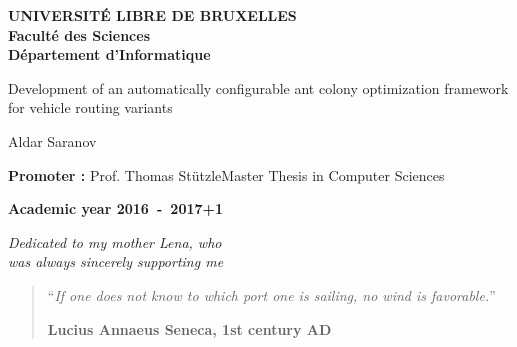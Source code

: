 \documentclass[11pt,a4paper,oneside]{book}
\begin{document}
\frontmatter
\begin{titlepage}
\begin{center}
\textbf{UNIVERSIT\'E LIBRE DE BRUXELLES}\\
\textbf{Facult\'e des Sciences}\\
\textbf{D\'epartement d'Informatique}
\vfill{}\vfill{}

{\Huge Development of an automatically configurable ant colony optimization framework for vehicle routing variants}

{\Huge \par}
\begin{center}{\LARGE Aldar Saranov}\end{center}{\Huge \par}
\vfill{}\vfill{}
\begin{flushright}{\large \textbf{Promoter :} Prof. Thomas St{\"u}tzle}\hfill{}{\large Master Thesis in Computer Sciences}\\
{\large }\hfill{}{}\end{flushright}{\large\par}
\vfill{}\vfill{}\enlargethispage{3cm}
\textbf{Academic year 2016~-~2017+1}
\end{center}
\end{titlepage}
\newpage
\thispagestyle{empty} 
\null

\newenvironment{vcenterpage}
{\newpage\thispagestyle{empty} 
\vspace*{\fill}}
{\vspace*{\fill}\par\pagebreak}

\begin{vcenterpage}
\begin{flushright}
    \large\em\null\vskip1in 
    Dedicated to my mother Lena, who\\
   was always sincerely supporting me\vfill
  \end{flushright}
\end{vcenterpage}
\thispagestyle{empty}
\vspace*{5cm}

\begin{quotation}
\noindent ``\emph{If one does not know to which port one is sailing, no wind is favorable.}''
\begin{flushright}\textbf{Lucius Annaeus Seneca, 1st century AD}\end{flushright}
\end{quotation}

\medskip
\end{document}
